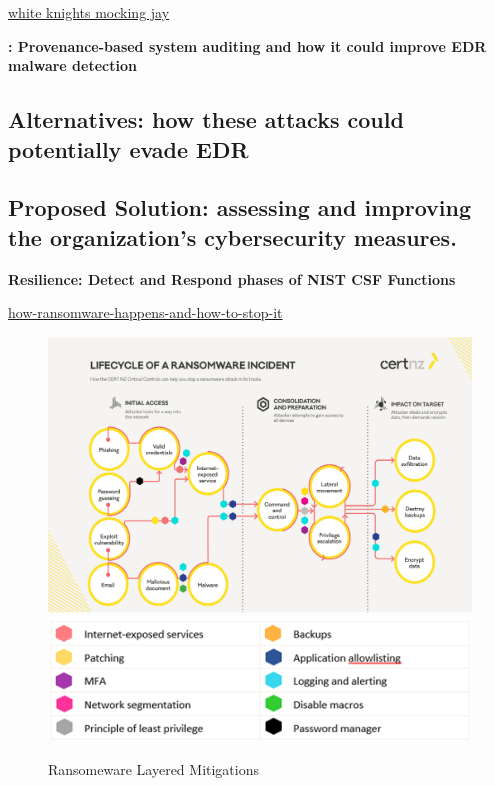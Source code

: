 \documentclass{article}
\begin{document}
\href{https://whiteknightlabs.com/2023/07/06/mockingjay-memory-allocation-primitive/}{white knights mocking jay}

\textbf{\textcite{Inam:2023}: Provenance-based system auditing and how it could improve EDR malware detection}


\subsection{Alternatives: how these attacks could potentially evade EDR}


\subsection{Proposed Solution: assessing and improving the organization's cybersecurity measures.}
\textbf{Resilience: Detect and Respond phases of NIST CSF Functions}

\href{https://www.cert.govt.nz/it-specialists/guides/how-ransomware-happens-and-how-to-stop-it/}{how-ransomware-happens-and-how-to-stop-it}

\begin{figure}[ht]
\includegraphics[scale=0.4]{certnz_aa23-165a.png}
\includegraphics[scale=0.6]{certnz_aa23-165b.png}
\caption{Ransomeware Layered Mitigations \autocite{Certnz:2021}}
\end{figure}
\end{document}
